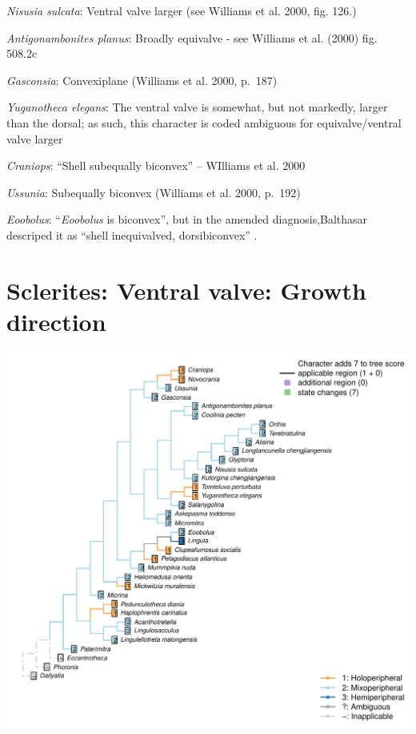 \documentclass[]{book}
\theoremstyle{definition}
\theoremstyle{definition}
\theoremstyle{definition}
\theoremstyle{remark}
\begin{document}
\emph{Nisusia sulcata}: Ventral valve larger (see Williams et al. 2000,
fig. 126.)

\emph{Antigonambonites planus}: Broadly equivalve - see Williams et al.
(2000) fig. 508.2c

\emph{Gasconsia}: Convexiplane (Williams et al. 2000, p.~187)

\emph{Yuganotheca elegans}: The ventral valve is somewhat, but not
markedly, larger than the dorsal; as such, this character is coded
ambiguous for equivalve/ventral valve larger

\emph{Craniops}: ``Shell subequally biconvex'' -- WIlliams et al. 2000

\emph{Ussunia}: Subequally biconvex (Williams et al. 2000, p.~192)

\emph{Eoobolus}: ``\emph{Eoobolus} is biconvex'', but in the amended
diagnosis,Balthasar descriped it as ``shell inequivalved,
dorsibiconvex'' .

\hypertarget{sclerites-ventral-valve-growth-direction}{%
\section*{Sclerites: Ventral valve: Growth
direction}\label{sclerites-ventral-valve-growth-direction}}

\includegraphics{Brachiopod_phylogeny_files/figure-latex/unnamed-chunk-5-30.pdf}
\end{document}

